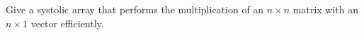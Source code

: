 Give a systolic array that performs the multiplication of an $n
\times  n$ matrix with an $n \times  1$ vector efficiently.
